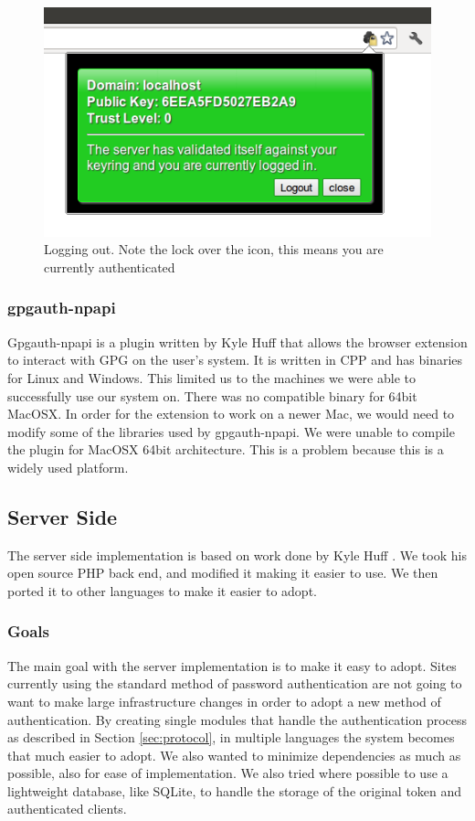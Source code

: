\documentclass[11pt]{article}
\begin{document}
\begin{figure}[h!]
\centering
\includegraphics[scale=0.5]{ext_logout}
\caption{Logging out. Note the lock over the icon, this means you are currently authenticated}
\label{fig:logout}
\end{figure}

\FloatBarrier
\subsubsection{gpgauth-npapi} \label{subsubsec:npapi}
Gpgauth-npapi is a plugin written by Kyle Huff that allows the browser extension to interact with GPG on the user's system. It is written in CPP and has binaries for Linux and Windows. This limited us to the machines we were able to successfully use our system on. There was no compatible binary for 64bit MacOSX. In order for the extension to work on a newer Mac, we would need to modify some of the libraries used by gpgauth-npapi. We were unable to compile the plugin for MacOSX 64bit architecture. This is a problem because this is a widely used platform.
\subsection{Server Side}
The server side implementation is based on work done by Kyle Huff \cite{gpgauth}. We took his open source PHP back end, and modified it making it easier to use. We then ported it to other languages to make it easier to adopt.
\subsubsection{Goals}
The main goal with the server implementation is to make it easy to adopt. Sites currently using the standard method of password authentication are not going to want to make large infrastructure changes in order to adopt a new method of authentication. By creating single modules that handle the authentication process as described in Section \ref{sec:protocol}, in multiple languages the system becomes that much easier to adopt. We also wanted to minimize dependencies as much as possible, also for ease of implementation. We also tried where possible to use a lightweight database, like SQLite, to handle the storage of the original token and authenticated clients. 
\end{document}
